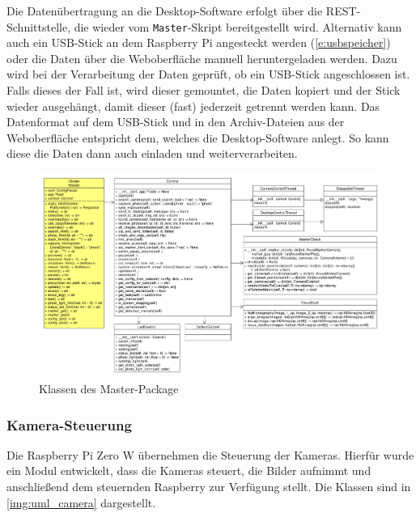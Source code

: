 \documentclass[./00PhotoBox.tex]{subfiles}
\begin{document}
Die Datenübertragung an die Desktop-Software erfolgt über die \Gls{REST}-Schnittstelle, die wieder vom \texttt{Master}-Skript bereitgestellt wird. Alternativ kann auch ein USB-Stick an dem Raspberry Pi angesteckt werden (\autoref{e:usbspeicher}) oder die Daten über die Weboberfläche manuell heruntergeladen werden. Dazu wird bei der Verarbeitung der Daten geprüft, ob ein USB-Stick angeschlossen ist. Falls dieses der Fall ist, wird dieser gemountet, die Daten kopiert und der Stick wieder ausgehängt, damit dieser (fast) jederzeit getrennt werden kann. Das Datenformat auf dem USB-Stick und in den Archiv-Dateien aus der Weboberfläche entspricht dem, welches die Desktop-Software anlegt. So kann diese die Daten dann auch einladen und weiterverarbeiten.

\begin{figure}
    \centering
    \includegraphics[width=1\textwidth]{./img/uml/uml_master_classdiagramm.pdf}
    \caption{Klassen des Master-Package}
    \label{img:master}
\end{figure}


\subsubsection{Kamera-Steuerung}
Die Raspberry Pi Zero W übernehmen die Steuerung der Kameras. Hierfür wurde ein Modul entwickelt, dass die Kameras steuert, die Bilder aufnimmt und anschließend dem steuernden Raspberry zur Verfügung stellt. Die Klassen sind in \autoref{img:uml_camera} dargestellt.
\end{document}
